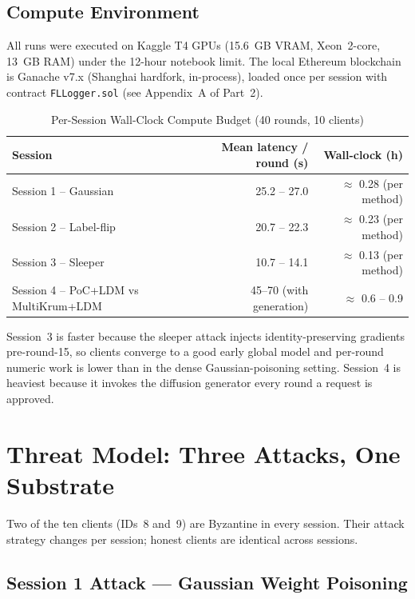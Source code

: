 \documentclass[11pt,a4paper]{article}
\begin{document}
\subsection{Compute Environment}

All runs were executed on Kaggle T4 GPUs (15.6~GB VRAM, Xeon~2-core,
13~GB RAM) under the 12-hour notebook limit. The local Ethereum
blockchain is Ganache v7.x (Shanghai hardfork, in-process), loaded once
per session with contract \texttt{FLLogger.sol} (see Appendix~A of
Part~2).

\begin{table}[H]
\centering
\caption{Per-Session Wall-Clock Compute Budget (40 rounds, 10 clients)}
\label{tab:budget}
\begin{tabular}{@{}lrr@{}}
\toprule
\textbf{Session} & \textbf{Mean latency / round (s)} & \textbf{Wall-clock (h)} \\
\midrule
Session 1 -- Gaussian                  & 25.2 -- 27.0 & $\approx$ 0.28 (per method) \\
Session 2 -- Label-flip                & 20.7 -- 22.3 & $\approx$ 0.23 (per method) \\
Session 3 -- Sleeper                   & 10.7 -- 14.1 & $\approx$ 0.13 (per method) \\
Session 4 -- PoC+LDM vs MultiKrum+LDM  & 45--70 (with generation) & $\approx$ 0.6 -- 0.9 \\
\bottomrule
\end{tabular}
\end{table}

Session~3 is faster because the sleeper attack injects identity-preserving
gradients pre-round-15, so clients converge to a good early global model
and per-round numeric work is lower than in the dense Gaussian-poisoning
setting. Session~4 is heaviest because it invokes the diffusion
generator every round a request is approved.

\section{Threat Model: Three Attacks, One Substrate}
\label{sec:threat}

Two of the ten clients (IDs~8 and~9) are Byzantine in every session.
Their attack strategy changes per session; honest clients are identical
across sessions.

\subsection{Session 1 Attack --- Gaussian Weight Poisoning}
\end{document}
